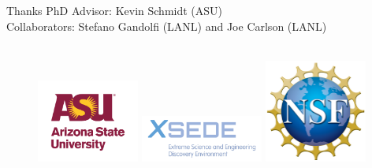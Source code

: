 \documentclass{beamer}
\begin{document}
\begin{frame}{Thanks}
PhD Advisor: Kevin Schmidt (ASU) \\
Collaborators: Stefano Gandolfi (LANL) and Joe Carlson (LANL)
\\~\\
\begin{figure}[h]
   \centering
   \includegraphics[width=0.30\textwidth]{figures/asu_university_vert_rgb_maroongold_150.png}
   \includegraphics[width=0.36\textwidth]{figures/xsede-full-color.jpg}
   \includegraphics[width=0.30\textwidth]{figures/NSF_4-Color_bitmap_Logo.png}
\end{figure}
\end{frame}
\end{document}
